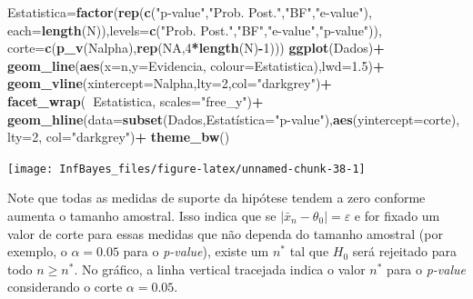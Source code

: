 \documentclass[
]{book}
\newenvironment{Shaded}{\begin{snugshade}}{\end{snugshade}}
\newcommand{\DataTypeTok}[1]{\textcolor[rgb]{0.13,0.29,0.53}{#1}}
\newcommand{\DecValTok}[1]{\textcolor[rgb]{0.00,0.00,0.81}{#1}}
\newcommand{\FloatTok}[1]{\textcolor[rgb]{0.00,0.00,0.81}{#1}}
\newcommand{\KeywordTok}[1]{\textcolor[rgb]{0.13,0.29,0.53}{\textbf{#1}}}
\newcommand{\NormalTok}[1]{#1}
\newcommand{\OperatorTok}[1]{\textcolor[rgb]{0.81,0.36,0.00}{\textbf{#1}}}
\newcommand{\OtherTok}[1]{\textcolor[rgb]{0.56,0.35,0.01}{#1}}
\newcommand{\StringTok}[1]{\textcolor[rgb]{0.31,0.60,0.02}{#1}}
\begin{document}
\begin{Shaded}
\begin{Highlighting}[]
       \DataTypeTok{Estatistica=}\KeywordTok{factor}\NormalTok{(}\KeywordTok{rep}\NormalTok{(}\KeywordTok{c}\NormalTok{(}\StringTok{"p-value"}\NormalTok{,}\StringTok{"Prob. Post."}\NormalTok{,}\StringTok{"BF"}\NormalTok{,}\StringTok{"e-value"}\NormalTok{),}
          \DataTypeTok{each=}\KeywordTok{length}\NormalTok{(N)),}\DataTypeTok{levels=}\KeywordTok{c}\NormalTok{(}\StringTok{"Prob. Post."}\NormalTok{,}\StringTok{"BF"}\NormalTok{,}\StringTok{"e-value"}\NormalTok{,}\StringTok{"p-value"}\NormalTok{)),}
       \DataTypeTok{corte=}\KeywordTok{c}\NormalTok{(}\KeywordTok{p_v}\NormalTok{(Nalpha),}\KeywordTok{rep}\NormalTok{(}\OtherTok{NA}\NormalTok{,}\DecValTok{4}\OperatorTok{*}\KeywordTok{length}\NormalTok{(N)}\OperatorTok{-}\DecValTok{1}\NormalTok{)))}
\KeywordTok{ggplot}\NormalTok{(Dados)}\OperatorTok{+}
\StringTok{  }\KeywordTok{geom_line}\NormalTok{(}\KeywordTok{aes}\NormalTok{(}\DataTypeTok{x=}\NormalTok{n,}\DataTypeTok{y=}\NormalTok{Evidencia, }\DataTypeTok{colour=}\NormalTok{Estatistica),}\DataTypeTok{lwd=}\FloatTok{1.5}\NormalTok{)}\OperatorTok{+}
\StringTok{  }\KeywordTok{geom_vline}\NormalTok{(}\DataTypeTok{xintercept=}\NormalTok{Nalpha,}\DataTypeTok{lty=}\DecValTok{2}\NormalTok{,}\DataTypeTok{col=}\StringTok{"darkgrey"}\NormalTok{)}\OperatorTok{+}
\StringTok{  }\KeywordTok{facet_wrap}\NormalTok{(}\OperatorTok{~}\NormalTok{Estatistica, }\DataTypeTok{scales=}\StringTok{"free_y"}\NormalTok{)}\OperatorTok{+}
\StringTok{  }\KeywordTok{geom_hline}\NormalTok{(}\DataTypeTok{data=}\KeywordTok{subset}\NormalTok{(Dados,Estatí}\DataTypeTok{stica=}\StringTok{"p-value"}\NormalTok{),}\KeywordTok{aes}\NormalTok{(}\DataTypeTok{yintercept=}\NormalTok{corte), }\DataTypeTok{lty=}\DecValTok{2}\NormalTok{, }\DataTypeTok{col=}\StringTok{"darkgrey"}\NormalTok{)}\OperatorTok{+}
\StringTok{  }\KeywordTok{theme_bw}\NormalTok{()}
\end{Highlighting}
\end{Shaded}

\begin{center}\texttt{[image: InfBayes\_files/figure-latex/unnamed-chunk-38-1]} \end{center}

Note que todas as medidas de suporte da hipótese tendem a zero conforme aumenta o tamanho amostral. Isso indica que se \(|\bar{x}_n-\theta_0|=\varepsilon\) e for fixado um valor de corte para essas medidas que não dependa do tamanho amostral (por exemplo, o \(\alpha=0.05\) para o \emph{p-value}), existe um \(n^*\) tal que \(H_0\) será rejeitado para todo \(n\geq n^*\). No gráfico, a linha vertical tracejada indica o valor \(n^*\) para o \emph{p-value} considerando o corte \(\alpha=0.05\).
\end{document}
